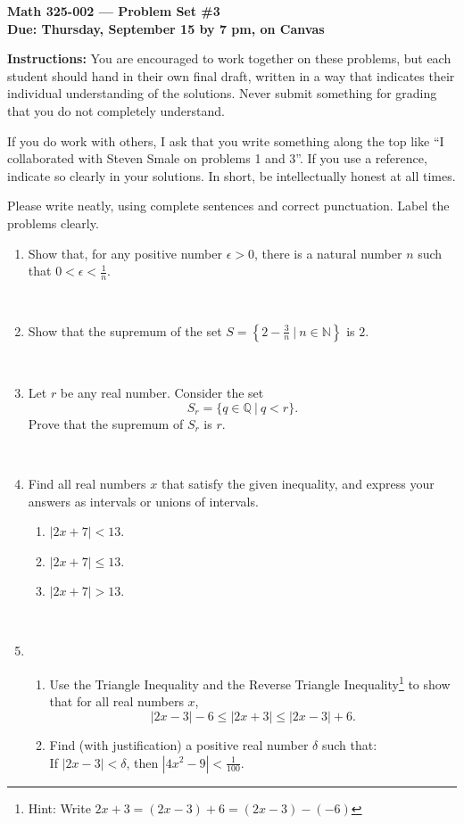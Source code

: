 \documentclass{amsart}
\def\e{\varepsilon}
\def\N{\mathbb N}
\def\Q{\mathbb Q}
\def\ds{\displaystyle}
\def\e{\epsilon}
\begin{document}
\begin{center}
{\large\bfseries
Math 325-002 --- Problem Set \#3 \\
Due: Thursday, September 15 by 7 pm, on Canvas}
\end{center}





{\bf Instructions:} You are encouraged to work together on these
problems, but each student should hand in their own final draft,
written in a way that indicates their individual understanding of
the solutions. Never submit something for grading
that you do not completely understand. 

If you do work with others, I ask that you write something along the
top like ``I collaborated with Steven Smale on problems 1 and 3''.
If you use a reference, indicate so clearly in your solutions. 
In short, be intellectually
honest at all times.

Please write neatly, using complete sentences and correct
punctuation. Label the problems clearly. 






\begin{enumerate}
\item Show that, for any positive number $\e>0$, there is a natural number $n$ such that $0 < \e < \frac1n$.

\

\item Show that the supremum of the set $\ds S= \left\{ 2 - \frac3n \ | \ n\in \N\right\}$ is $2$.

\

\item Let $r$ be any real number. Consider the set
\[ S_r = \{ q\in \Q \ | \ q < r\}.\]
Prove that the supremum of $S_r$ is $r$.

\

\item Find all real numbers $x$ that satisfy the given inequality, and express your answers as intervals or unions of intervals.
\begin{enumerate}
\item $|2x+7| < 13$.
\item $|2x+7| \leq 13$.
\item $|2x+7| > 13$.
\end{enumerate}

\

\item \begin{enumerate}
\item Use the Triangle Inequality and the Reverse Triangle Inequality\footnote{Hint: Write $2x+3 = (2x - 3) + 6 = (2x-3) - (-6)$} to show that for all real numbers $x$,
\[ |2x-3| - 6 \leq |2x+3| \leq |2x-3| + 6.\]
\item Find (with justification) a positive real number $\delta$ such that:\\
If $|2x-3| < \delta$, then $|4x^2-9|< \frac{1}{100}$.
\end{enumerate}



\end{enumerate}
\end{document}
